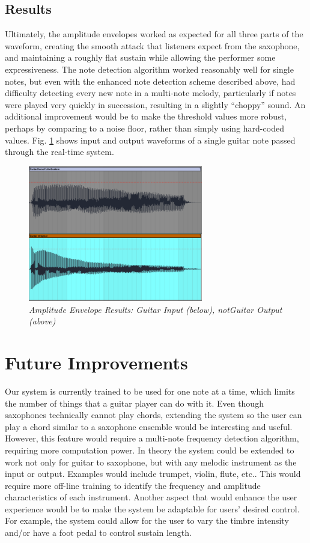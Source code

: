 \documentclass[twoside,a4paper]{article}
\begin{document}
\subsection {Results}
Ultimately, the amplitude envelopes worked as expected for all three parts
of the waveform,  creating the smooth attack that listeners expect from the
saxophone, and maintaining a roughly flat sustain while allowing the performer
some expressiveness. The note detection algorithm
worked reasonably well for single notes, but even with the enhanced note detection
scheme described above, had difficulty detecting every new note in a multi-note melody,
particularly if notes were played very quickly in succession, resulting in a slightly
``choppy'' sound. An additional improvement would be to make the threshold values more robust,
perhaps by comparing to a noise floor, rather than simply using hard-coded values.
Fig. \ref{Result} shows input and output waveforms of a single guitar note passed through
the real-time system.

\begin{figure}[ht]
  \includegraphics[width=3in]{Pictures/Final_pic.PNG}
  \centering
  \caption{\label{Result} {\it Amplitude Envelope Results: Guitar Input (below), notGuitar Output (above)}}
  \centering
  \end{figure}

\section{Future Improvements}
Our system is currently trained to be used for one note at a time,
which limits the number of things that a guitar player can do with
it. Even though saxophones technically cannot play chords, extending
the system so the user can play a chord similar to a 
saxophone ensemble would be interesting and useful.
However, this feature would require a multi-note frequency detection
algorithm, requiring more computation power.
\newline\newline
In theory the system could be extended to work not only for guitar
to saxophone, but with any melodic instrument as the input or output.
Examples would include trumpet, violin, flute, etc.. This would
require more off-line training to identify the frequency and
amplitude characteristics of each instrument. Another aspect that would enhance the user experience
would be to make the system be adaptable for users' desired control.
For example, the system could allow for the user to vary the timbre intensity
and/or have a foot pedal to control sustain length.
\end{document}
